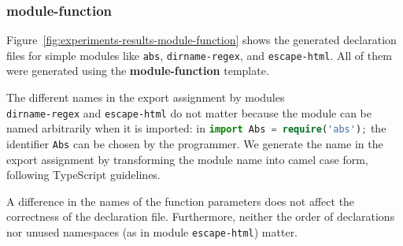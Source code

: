 \documentclass[sigplan,screen]{acmart}
\newcommand{\figref}[1]{Figure~\ref{#1}}
\begin{document}
\subsubsection{module-function}
\figref{fig:experiments-results-module-function} shows the generated
declaration files for simple modules like \texttt{abs},
\texttt{dirname-regex}, and \texttt{escape-html}. All of them were
generated using the \textbf{module-function} template. 

The different names in the export assignment by modules \\
\texttt{dirname-regex} and
\texttt{escape-html} do not matter because the module can be named arbitrarily when it is imported: in
\lstinline[language=TypeScript]/import Abs = require('abs');/ the
identifier \lstinline[language=TypeScript]/Abs/ can be chosen by the
programmer. We generate the name in the export 
assignment by transforming the module name into camel case form, following TypeScript
guidelines.

A difference in the names of the function parameters does not affect the correctness of
the declaration file.
Furthermore, neither the order of declarations nor unused namespaces
(as in module \texttt{escape-html}) matter.
\end{document}
